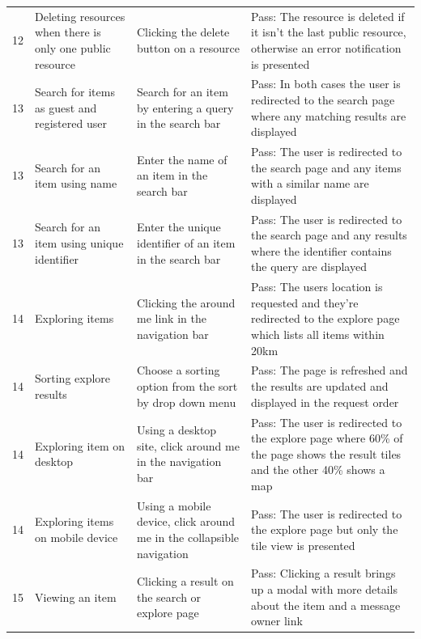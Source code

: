 \begin{longtable}{@{}p{}p{}p{}p{}@{}}
	12 & Deleting resources when there is only one public resource & Clicking the delete button on a resource & \textcolor{PassGreen}{Pass}: The resource is deleted if it isn't the last public resource, otherwise an error notification is presented \\
	
	13 & Search for items as guest and registered user & Search for an item by entering a query in the search bar & \textcolor{PassGreen}{Pass}: In both cases the user is redirected to the search page where any matching results are displayed \\
	
	13 & Search for an item using name & Enter the name of an item in the search bar & \textcolor{PassGreen}{Pass}: The user is redirected to the search page and any items with a similar name are displayed \\
	
	13 & Search for an item using unique identifier & Enter the unique identifier of an item in the search bar & \textcolor{PassGreen}{Pass}: The user is redirected to the search page and any results where the identifier contains the query are displayed \\
	
	14 & Exploring items & Clicking the around me link in the navigation bar & \textcolor{PassGreen}{Pass}: The users location is requested and they're redirected to the explore page which lists all items within 20km \\

	14 & Sorting explore results & Choose a sorting option from the sort by drop down menu & \textcolor{PassGreen}{Pass}: The page is refreshed and the results are updated and displayed in the request order \\
	
	14 & Exploring item on desktop & Using a desktop site, click around me in the navigation bar & \textcolor{PassGreen}{Pass}: The user is redirected to the explore page where 60\% of the page shows the result tiles and the other 40\% shows a map \\
	
	14 & Exploring items on mobile device & Using a mobile device, click around me in the collapsible navigation & \textcolor{PassGreen}{Pass}: The user is redirected to the explore page but only the tile view is presented \\
	
	15 & Viewing an item & Clicking a result on the search or explore page & \textcolor{PassGreen}{Pass}: Clicking a result brings up a modal with more details about the item and a message owner link \\
	

\end{longtable}
